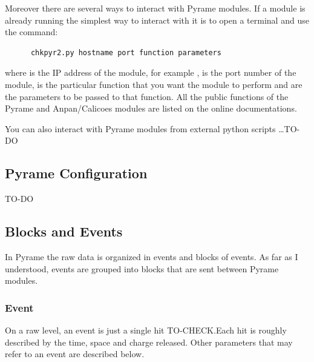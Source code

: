 Moreover there are several ways to interact with Pyrame modules. If a
module is already running the simplest way to interact with it is to
open a terminal and use the command:
\begin{lstlisting}
      chkpyr2.py hostname port function parameters
\end{lstlisting}
where  is the IP address of the module, for
example ,  is the port number
of the module,  is the particular function that
you want the module to perform and  are the
parameters to be passed to that function. All the public functions of
the Pyrame and Anpan/Calicoes modules are listed on the online
documentations.

You can also interact with Pyrame modules from external python scripts
\dots TO-DO

\subsection{Pyrame Configuration}\label{sec:pyrame-configuration}

TO-DO

\subsection{Blocks and Events}\label{sec:blocks-events}
In Pyrame the raw data is organized in events and blocks of events. As
far as I understood, events are grouped into blocks that are sent
between Pyrame modules.

\subsubsection{Event}
On a raw level, an event is just a single hit TO-CHECK.\@ Each hit is
roughly described by the time, space and charge released. Other
parameters that may refer to an event are described below.

